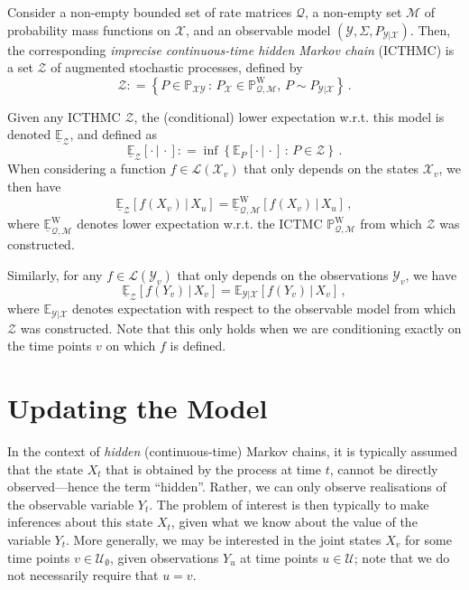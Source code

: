 \documentclass[twoside,11pt]{article}
\newcommand{\states}{\mathcal{X}}
\newcommand{\observs}{\mathcal{Y}}
\newcommand{\processes}{\mathbb{P}}
\newcommand{\wprocesses}{\processes^{\mathrm{W}}}
\newcommand{\lexp}{\underline{\mathbb{E}}_{\rateset,\mathcal{M}}^\mathrm{W}}
\newcommand{\gambles}{\mathcal{L}}
\newcommand{\rateset}{\mathcal{Q}}
\newcommand{\coloneqq}{:\!=}
\begin{document}
\begin{definition}\label{def:hidden_ictmc}
Consider a non-empty bounded set of rate matrices $\rateset$, a non-empty set $\mathcal{M}$ of probability mass functions on $\states$, and an observable model $(\observs,\Sigma,P_{\observs\vert\states})$. Then, the corresponding \emph{imprecise continuous-time hidden Markov chain} (ICTHMC) is a set $\mathcal{Z}$ of augmented stochastic processes, defined by
\begin{equation*}
\mathcal{Z} \coloneqq \left\{ P\in\mathbb{P}_{\states\observs} \,:\, P_{\states}\in\wprocesses_{\rateset,\mathcal{M}},\, P\sim P_{\observs\vert\states}\right\}\,.
\end{equation*}
\end{definition}

Given any ICTHMC $\mathcal{Z}$, the (conditional) lower expectation w.r.t. this model is denoted $\underline{\mathbb{E}}_\mathcal{Z}$, and defined as
\begin{equation*}
\underline{\mathbb{E}}_\mathcal{Z}[\cdot\,\vert\,\cdot] \coloneqq \inf\left\{ \mathbb{E}_P[\cdot\,\vert\,\cdot]\,:\,P\in\mathcal{Z} \right\}\,.
\end{equation*}
When considering a function $f\in\gambles(\states_v)$ that only depends on the states $\states_v$, we then have
\begin{equation*}
\underline{\mathbb{E}}_\mathcal{Z}[f(X_v)\,\vert\,X_u] = \lexp[f(X_v)\,\vert\,X_u]\,,
\end{equation*}
where $\lexp$ denotes lower expectation w.r.t. the ICTMC $\wprocesses_{\rateset,\mathcal{M}}$ from which $\mathcal{Z}$ was constructed.

Similarly, for any $f\in\gambles(\observs_v)$ that only depends on the observations $\observs_v$, we have
\begin{equation*}
\underline{\mathbb{E}}_\mathcal{Z}[f(Y_v)\,\vert\,X_v] = \mathbb{E}_{\observs\vert\states}[f(Y_v)\,\vert\,X_v]\,,
\end{equation*}
where $\mathbb{E}_{\observs\vert\states}$ denotes expectation with respect to the observable model from which $\mathcal{Z}$ was constructed. Note that this only holds when we are conditioning exactly on the time points $v$ on which $f$ is defined.

\section{Updating the Model}\label{sec:updating_model}

In the context of \emph{hidden} (continuous-time) Markov chains, it is typically assumed that the state $X_t$ that is obtained by the process at time $t$, cannot be directly observed---hence the term ``hidden''. Rather, we can only observe realisations of the observable variable $Y_t$. The problem of interest is then typically to make inferences about this state $X_t$, given what we know about the value of the variable $Y_t$. More generally, we may be interested in the joint states $X_v$ for some time points $v\in\mathcal{U}_\emptyset$, given observations $Y_u$ at time points $u\in\mathcal{U}$; note that we do not necessarily require that $u=v$.
\end{document}
